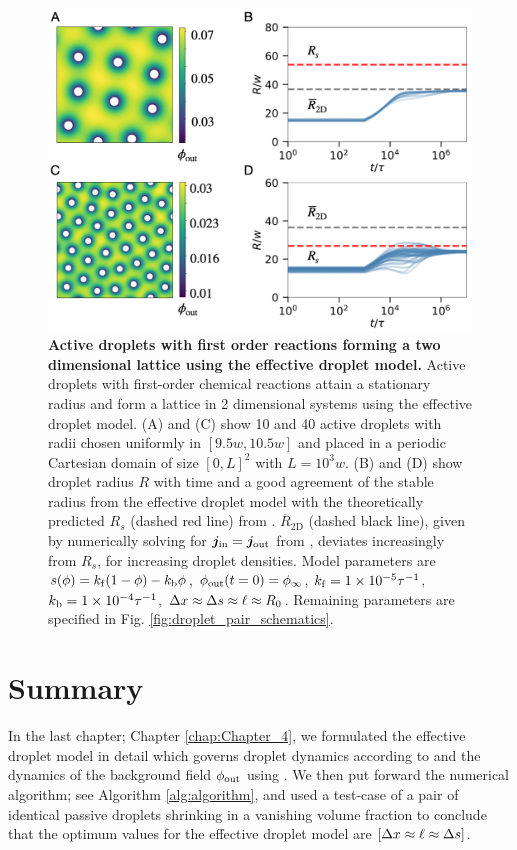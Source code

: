 \begin{figure}[tb]
\centering
\includegraphics[scale=0.5]{MainContent/Figures/lattice_2D.pdf}
\caption{\textbf{Active droplets with first order reactions forming a two dimensional lattice using the effective droplet model.}
Active droplets with first-order chemical reactions attain a stationary radius and form a lattice in 2 dimensional systems using the effective droplet model.
(A) and (C) show 10 and 40 active droplets with radii chosen uniformly in $[9.5w, 10.5w]$ and placed in a periodic Cartesian domain of size $[0, L]^2$ with $L=10^3 w$.
(B) and (D) show droplet radius $R$ with time and a good agreement of the stable radius from the effective droplet model with the theoretically predicted $R_s$ (dashed red line) from . 
$\overline{R}_\mathrm{2D}$ (dashed black line), given by numerically solving for $\boldsymbol{j}_\mathrm{in} = \boldsymbol{j}_\mathrm{out}$ from , deviates increasingly from $R_s$, for increasing droplet densities.
Model parameters are $s(\phi)= k_\mathrm{f} (1 - \phi) - k_\mathrm{b} \phi$, $\phi_\mathrm{out}(t=0) =\phi_\infty$, $k_\mathrm{f} = 1 \times 10^{-5} \tau^{-1}$, $k_\mathrm{b} = 1 \times 10^{-4}  \tau^{-1}$, $\Delta x \approx \Delta s \approx \ell \approx R_0$.
Remaining parameters are specified in Fig. \ref{fig:droplet_pair_schematics}.
}
\label{fig:lattice_2D}
\end{figure}

\section{Summary}

In the last chapter; Chapter \ref{chap:Chapter_4}, we formulated the effective droplet model in detail which governs droplet dynamics according to  and the dynamics of the background field $\phi_\mathrm{out}$ using .
We then put forward the numerical algorithm; see Algorithm \ref{alg:algorithm}, and used a test-case of a pair of identical passive droplets shrinking in a vanishing volume fraction to conclude that the optimum values for the effective droplet model are $[\Delta x \approx \ell \approx \Delta s]$.

